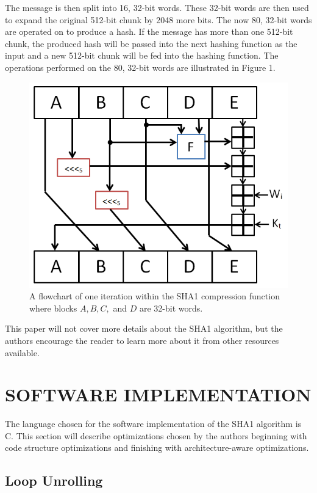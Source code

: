 \documentclass[letterpaper, 10 pt, conference]{ieeeconf}  %
\begin{document}
The message is then split into 16, 32-bit words.  These 32-bit words are then used to expand the original 512-bit chunk by 2048 more bits.  The now 80, 32-bit words are operated on to produce a hash.  If the message has more than one 512-bit chunk, the produced hash will be passed into the next hashing function as the input and a new 512-bit chunk will be fed into the hashing function.  The operations performed on the 80, 32-bit words are illustrated in Figure 1.

\begin{figure}[thpb]
	\centering
	\includegraphics[scale=0.5]{sha1}
    \caption{A flowchart of one iteration within the SHA1 compression function where blocks $A,B,C,$ and $D$ are 32-bit words.}
\end{figure}

This paper will not cover more details about the SHA1 algorithm, but the authors encourage the reader to learn more about it from other resources available. 

\section{SOFTWARE IMPLEMENTATION}

The language chosen for the software implementation of the SHA1 algorithm is C.  This section will describe optimizations chosen by the authors beginning with code structure optimizations and finishing with architecture-aware optimizations.

\subsection{Loop Unrolling}
\end{document}
